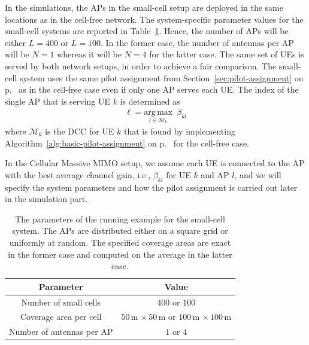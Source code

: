 In the simulations, the APs in the small-cell setup are deployed in the same locations as in the cell-free network. The system-specific parameter values for the small-cell systems are reported in Table~\ref{tab:system_parameters_running_example_small_cell}.  Hence, the number of APs will be either $L=400$ or $L=100$. In the former case, the number of antennas per AP will be $N=1$ whereas it will be $N=4$ for the latter case. 
	The same set of UEs is served by both network setups, in order to achieve a fair comparison. The small-cell system uses the same pilot assignment from Section~\ref{sec:pilot-assignment} on p.~\pageref{sec:pilot-assignment} as in the cell-free case even if only one AP serves each UE. The index of the single AP that is serving UE $k$ is determined as
	\begin{align} \label{eq:selection_small_cell}
	\ell = \underset{l\in \mathcal{M}_k}{\mathrm{arg \, max}}  \,\,\, \beta_{k l}
	\end{align}
	where $\mathcal{M}_k$ is the  DCC for UE $k$ that is found by implementing Algorithm~\ref{alg:basic-pilot-assignment} on p.~\pageref{alg:basic-pilot-assignment} for the cell-free case.
 

 In the Cellular Massive MIMO setup, we assume each UE is connected to the AP with the best average channel gain, i.e., $\beta_{kl}$ for UE $k$ and AP $l$, and we will specify the system parameters and how the pilot assignment is carried out later in the simulation part.
 

\begin{table}[t]
	\renewcommand{\arraystretch}{1.}
	\centering
	\begin{tabular}{|c|c|}
		\hline \bfseries $\!\!\!\!\!$ Parameter $\!\!\!\!\!$ & \bfseries Value\\
		\hline\hline
		
		Number of small cells &  $400$ or $100$ \\
		Coverage area per cell &  $50$\,m $ \times\,  50$\,m or $100$\,m $ \times\,  100$\,m \\
		Number of antennas per AP  & $1$ or $4$ \\
		
		\hline
	\end{tabular}
	\caption{The parameters of the running example for the small-cell system. The APs are distributed either on a square grid or uniformly at random. The specified coverage areas are exact in the former case and computed on the average in the latter case.}
	\label{tab:system_parameters_running_example_small_cell}
\end{table}


